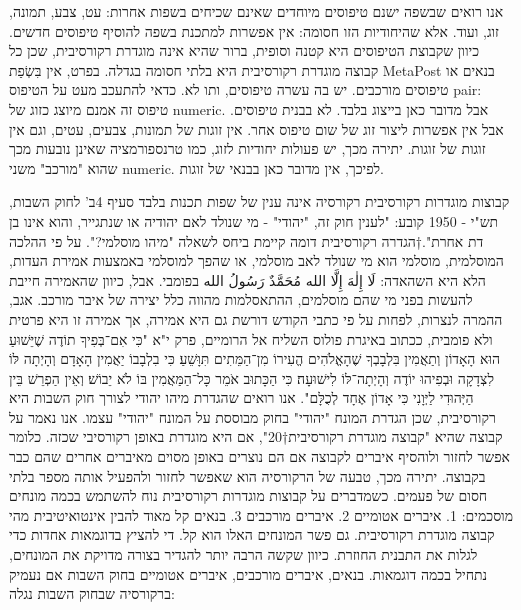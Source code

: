 אנו רואים שבשפה ישנם טיפוסים מיוחדים שאינם שכיחים בשפות אחרות: עט, צבע, תמונה, זוג, ועוד. אלא שהיחודיות הזו חסומה: אין אפשרות למתכנת בשפה להוסיף טיפוסים חדשים. כיוון שקבוצת הטיפוסים היא קטנה וסופית, ברור שהיא אינה מוגדרת רקורסיבית, שכן כל קבוצה מוגדרת רקורסיבית היא בלתי חסומה בגדלה. בפרט, אין בִּשְׂפַת MetaPost בנאים או טיפוסים מורכבים. יש בה עשרה טיפוסים, ותו לא.
כדאי להתעכב מעט על הטיפוס pair: טיפוס זה אמנם מיוצג כזוג של numeric. אבל מדובר כאן בייצוג בלבד. לא בבנית טיפוסים. אבל אין אפשרות ליצור זוג של שום טיפוס אחר. אין זוגות של תמונות, צבעים, עטים, וגם אין זוגות של זוגות. יתירה מכך, יש פעולות יחודיות לזוג, כמו טרנספורמציה שאינן נובעות מכך שהוא "מורכב" משני numeric. לפיכך, אין מדובר כאן בבנאי של זוגות.

קבוצות מוגדרות רקורסיבית
      רקורסיה אינה ענין של שפות תכנות בלבד
      סעיף 4ב' לחוק השבות, תש"י - 1950 קובע:
      "לענין חוק זה, "יהודי" - מי שנולד לאם יהודיה או שנתגייר, והוא אינו בן דת אחרת".†{הגדרה רקורסיבית דומה קיימת ביחס לשאלה "מיהו מוסלמי?". על פי ההלכה המוסלמית, מוסלמי הוא מי שנולד לאב מוסלמי, או שהפך למוסלמי באמצעות אמירת העדות, הלא היא השהאדה: لَا إِلٰهَ إِلَّا الله مُحَمَّدٌ رَسُولُ الله בפומבי. אבל, כיוון שהאמירה חייבת להעשות בפני מי שהם מוסלמים, ההתאסלמות מהווה כלל יצירה של איבר מורכב. אגב, ההמרה לנצרות, לפחות על פי כתבי הקודש דורשת גם היא אמירה, אך אמירה זו היא פרטית ולא פומבית, ככתוב באיגרת פולוס השליח אל הרומיים, פרק י"א "כִּי אִם־בְּפִיךָ תוֹדֶה שֶׁיֵּשׁוּעַ הוּא הָאָדוֹן וְתַאֲמִין בִּלְבָבְךָ שֶׁהָאֱלֹהִים הֱעִירוֹ מִן־הַמֵּתִים תִּוָּשֵׁעַ׃ כִּי בִלְבָבוֹ יַאֲמִין הָאָדָם וְהָיְתָה לּוֹ לִצְדָקָה וּבְפִיהוּ יוֹדֶה וְהָיְתָה־לּוֹ לִישׁוּעָה׃ כִּי הַכָּתוּב אֹמֵר כָּל־הַמַּאֲמִין בּוֹ לֹא יֵבוֹשׁ׃ וְאֵין הַפְרֵשׁ בֵּין הַיְּהוּדִי לַיְּוָנִי כִּי אָדוֹן אֶחָד לְכֻלָּם".}
      אנו רואים שהגדרת מיהו יהודי לצורך חוק השבות היא רקורסיבית, שכן הגדרת המונח "יהודי" בחוק מבוססת על המונח "יהודי" עצמו.
      אנו נאמר על קבוצה שהיא "קבוצה מוגדרת רקורסיבית†{20}", אם היא מוגדרת באופן רקורסיבי שכזה. כלומר אפשר לחזור ולוהסיף איברים לקבוצה אם הם נוצרים באופן מסוים מאיברים אחרים שהם כבר בקבוצה. יתירה מכך, טבעה של הרקורסיה הוא שאפשר לחזור ולהפעיל אותה מספר בלתי חסום של פעמים.
      כשמדברים על קבוצות מוגדרות רקורסיבית נוח להשתמש בכמה מונחים מוסכמים:
      1. איברים אטומיים
      2. איברים מורכבים
      3. בנאים
      קל מאוד להבין אינטואיטיבית מהי קבוצה מוגדרת רקורסיבית. גם פשר המונחים האלו הוא קל. די להציץ בדוגמאות אחדות כדי לגלות את התבנית החוזרת. כיוון שקשה הרבה יותר להגדיר בצורה מדויקת את המונחים, נתחיל בכמה דוגמאות.
      בנאים, איברים מורכבים, איברים אטומיים בחוק השבות
      אם נעמיק ברקורסיה שבחוק השבות נגלה:
